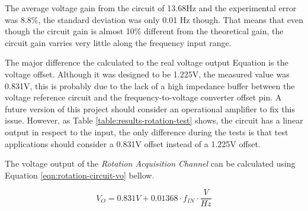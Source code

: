 		The average voltage gain from the circuit of 13.68Hz and the experimental error was 8.8$\%$, the standard deviation was only 0.01 Hz though. That means that even though the circuit gain is almost 10$\%$ different from the theoretical gain, the circuit gain varries very little along the frequency input range.
		\par
		The major difference the calculated to the real voltage output Equation is the voltage offset. Although it was designed to be 1.225V, the measured value was 0.831V, this is probably due to the lack of a high impedance buffer between the voltage reference circuit and the frequency-to-voltage converter offset pin. A future version of this project should consider an operational amplifier to fix this issue. However, as Table \ref{table:results-rotation-test} shows, the circuit has a linear output in respect to the input, the only difference during the tests is that test applications should consider a 0.831V offset instead of a 1.225V offset.
		\par
		The voltage output of the \textit{Rotation Acquisition Channel} can be calculated using Equation \ref{eqn:rotation-circuit-vo} bellow.
			
			\begin{equation}\label{eqn:rotation-circuit-vo}
				V_{O}=0.831V + 0.01368 \cdot f_{IN}  \cdot \frac{V}{Hz}
			\end{equation}
